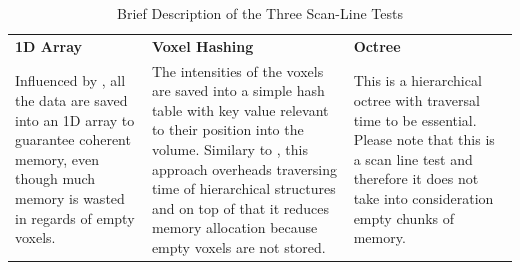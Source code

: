 \documentclass{subfiles}
\begin{document}
\begin{table}[!htbp]
	\renewcommand{\arraystretch}{1.3}
	
	\centering
	\begin{tabular}{|P{0.3\textwidth}|P{0.3\textwidth}|P{0.3\textwidth}|}
			
		\hline
		\textbf{1D Array} &	\textbf{Voxel Hashing} & \textbf{Octree}  \\
		\hlinewd{1.5pt}
		{\color{blue}Influenced by \cite{Hadwiger2012}, all the data are saved into an 1D array to guarantee coherent memory, even though much memory is wasted in regards of empty voxels.} &	{\color{blue}The intensities of the voxels are saved into a simple hash table with key value relevant to their position into the volume. Similary to \cite{Nievner2016voxelHashing}, this approach overheads traversing time of hierarchical structures and on top of that it reduces memory allocation because empty voxels are not stored. } & {\color{blue} This is a  hierarchical octree with traversal time to be essential. Please note that this is a scan line test and therefore it does not take into consideration empty chunks of memory.}\\	
		\hline
	\end{tabular}
	\caption{Brief Description of the Three Scan-Line Tests}
	\label{tab:DataStructuresScanline}
\end{table}
\end{document}
